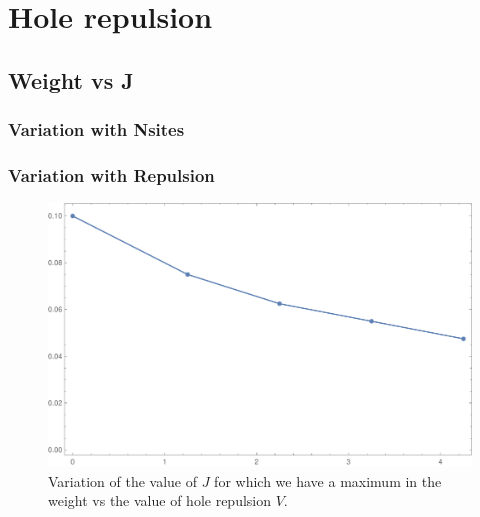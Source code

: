 \documentclass[ openright,titlepage,numbers=noenddot,headinclude,twoside,%
                footinclude=true,cleardoublepage=empty,abstractoff,%
                BCOR=5mm,paper=a4,fontsize=11pt,%
                ngerman,american,%
]{scrreprt}
\begin{document}
\section{Hole repulsion}


\subsection{Weight vs J}
\subsubsection{Variation with Nsites}
\subsubsection{Variation with Repulsion}

\begin{figure}[ht]
    \centering
    \includegraphics[scale=0.5]{12_4h_J_wmax_vs_xrep.pdf}
    \caption{\label{fig:}Variation of the value of $J$ for which we have a maximum in the weight vs the value of hole repulsion $V$. }
\end{figure}
\end{document}
